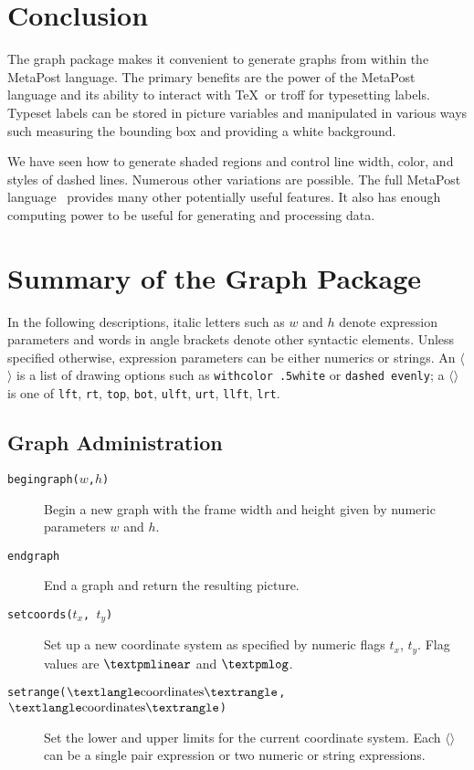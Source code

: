 \documentclass{article} %
\newcommand\descr[1]{{\langle\hbox{\rm#1}\rangle}}
\newcommand\invisgap{\nobreak\hskip0pt\relax}
\newcommand\tdescr[1]{$\langle$\invisgap{\rm#1}\invisgap$\rangle$}
\begin{document}
\section{Conclusion}
\label{concl}

The graph package makes it convenient to generate graphs from within the MetaPost
language.  The primary benefits are the power of the MetaPost language and its
ability to interact with \TeX\ or troff for typesetting labels.  Typeset labels
can be stored in picture variables and manipulated in various ways such measuring
the bounding box and providing a white background.

We have seen how to generate shaded regions and control line width, color, and
styles of dashed lines.  Numerous other variations are possible.
The full MetaPost language~\cite{ho:mp3} provides many other potentially useful
features.  It also has enough computing power to be useful for generating and
processing data.



\appendix
\section{Summary of the Graph Package}
\label{summsec}


In the following descriptions, italic letters such as $w$ and $h$ denote
expression parameters and words in angle brackets denote other syntactic
elements.  Unless specified otherwise, expression parameters can be either
numerics or strings.  An \tdescr{option list} is a list of drawing options such
as {\tt withcolor .5white} or {\tt dashed evenly};
a \tdescr{label suffix} is one of {\tt lft}, {\tt rt}, {\tt top}, {\tt bot},
{\tt ulft}, {\tt urt}, {\tt llft}, {\tt lrt}.

\subsection{Graph Administration}

\begin{description}
\item[{\tt begingraph($w$,$h$)}]
        Begin a new graph with the frame width and height given by numeric
        parameters $w$ and $h$.
\item[{\tt endgraph}]
        End a graph and return the resulting picture.
\item[{\tt setcoords($t_x$,\,$t_y$)}]
        Set up a new coordinate system as specified by numeric flags $t_x$,
        $t_y$.  Flag values are $\pm{\tt linear}$ and $\pm{\tt log}$.
\item[{\tt setrange($\descr{coordinates}$,\,$\descr{coordinates}$)}]
        Set the lower and upper limits for the current coordinate system.
        Each \tdescr{coordinates} can be a single pair expression or two
        numeric or string expressions.
\end{description}
\end{document}
